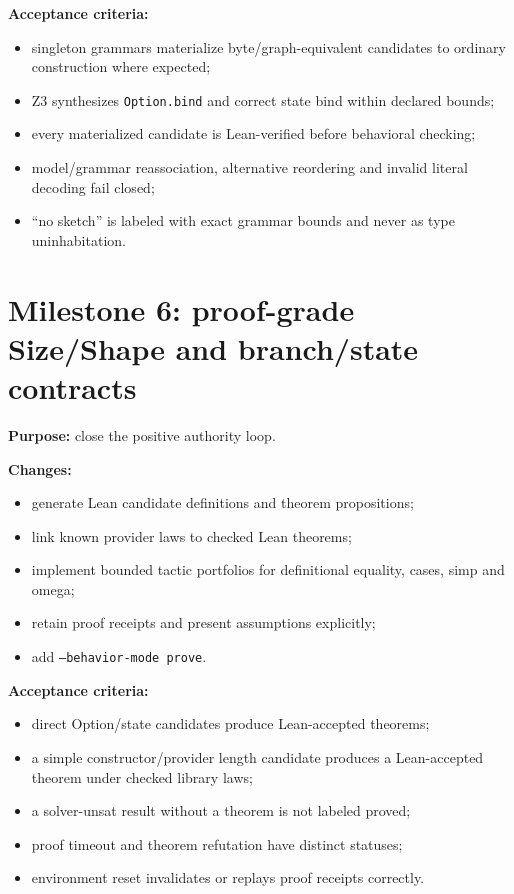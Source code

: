 \documentclass[11pt,oneside]{report}
\newcommand{\code}[1]{\texttt{#1}}
\begin{document}
\textbf{Acceptance criteria:}

\begin{itemize}[leftmargin=2em]
\item singleton grammars materialize byte/graph-equivalent candidates to ordinary construction where expected;
\item Z3 synthesizes \code{Option.bind} and correct state bind within declared bounds;
\item every materialized candidate is Lean-verified before behavioral checking;
\item model/grammar reassociation, alternative reordering and invalid literal decoding fail closed;
\item ``no sketch'' is labeled with exact grammar bounds and never as type uninhabitation.
\end{itemize}

\section{Milestone 6: proof-grade Size/Shape and branch/state contracts}

\textbf{Purpose:} close the positive authority loop.

\textbf{Changes:}

\begin{itemize}[leftmargin=2em]
\item generate Lean candidate definitions and theorem propositions;
\item link known provider laws to checked Lean theorems;
\item implement bounded tactic portfolios for definitional equality, cases, simp and omega;
\item retain proof receipts and present assumptions explicitly;
\item add \code{--behavior-mode prove}.
\end{itemize}

\textbf{Acceptance criteria:}

\begin{itemize}[leftmargin=2em]
\item direct Option/state candidates produce Lean-accepted theorems;
\item a simple constructor/provider length candidate produces a Lean-accepted theorem under checked library laws;
\item a solver-unsat result without a theorem is not labeled proved;
\item proof timeout and theorem refutation have distinct statuses;
\item environment reset invalidates or replays proof receipts correctly.
\end{itemize}
\end{document}
